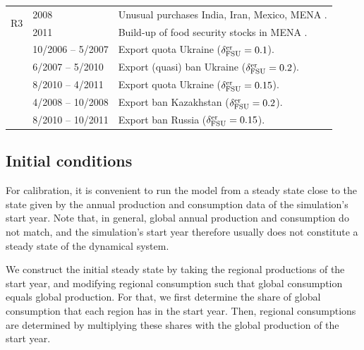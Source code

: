 \begin{table}[ht]
\begin{tabularx}{\textwidth}{llX}
      \multirow{2}{*}{R3}
            & \multirow{1}{*}{2008} & Unusual purchases India, Iran, Mexico, MENA \cite{HEA08}.\\
            & \multirow{1}{*}{2011} & Build-up of food security stocks in MENA \cite{TRO11}.\\
      \midrule\midrule
            & \multirow{1}{*}{10/2006 -- 5/2007}  & Export quota Ukraine \cite{SHA11} ($\delta^{\operatorname{er}}_{\operatorname{FSU}}=0.1$).\\
            & \multirow{1}{*}{6/2007 -- 5/2010}  & Export (quasi) ban Ukraine \cite{SHA11} ($\delta^{\operatorname{er}}_{\operatorname{FSU}}=0.2$).\\
            & \multirow{1}{*}{8/2010 -- 4/2011}  & Export quota Ukraine \cite{SHA11} ($\delta^{\operatorname{er}}_{\operatorname{FSU}}=0.15$).\\
       & \multirow{1}{*}{4/2008 -- 10/2008} & Export ban Kazakhstan \cite{SHA11} ($\delta^{\operatorname{er}}_{\operatorname{FSU}}=0.2$).\\
       & \multirow{1}{*}{8/2010 -- 10/2011}  & Export ban Russia \cite{TRO11,GrainChain12} ($\delta^{\operatorname{er}}_{\operatorname{FSU}}=0.15$).\\
      \bottomrule
    \end{tabularx}
 \end{table}

\subsection{Initial conditions}
\label{si:iniCond}
For calibration, it is convenient to run the model from a steady state close to the state given by
the annual production and consumption data of the simulation's start year. Note that, in general,
global annual production and consumption do not match, and the simulation's start year therefore
usually does not constitute a steady state of the dynamical system.

We construct the initial steady state by taking the regional productions of the start year, and
modifying regional consumption such that global consumption equals global production. For that, we
first determine the share of global consumption that each region has in the start year. Then,
regional consumptions are determined by multiplying these shares with the global production of the
start year.

